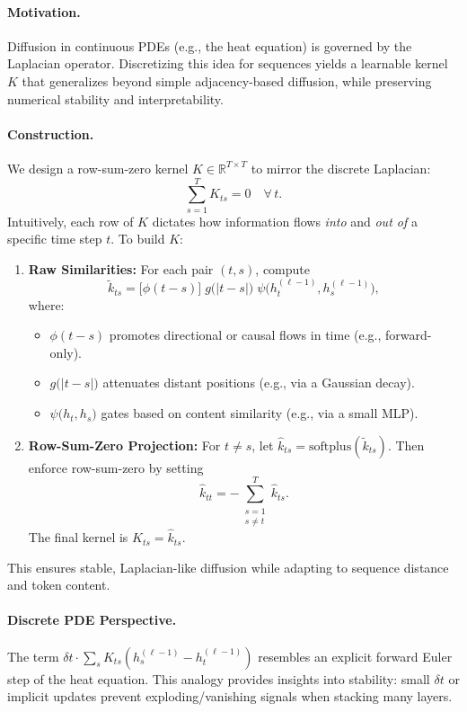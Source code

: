 \paragraph{Motivation.}
Diffusion in continuous PDEs (e.g., the heat equation) is governed by the Laplacian operator. Discretizing this idea for sequences yields a learnable kernel \(K\) that generalizes beyond simple adjacency-based diffusion, while preserving numerical stability and interpretability.

\paragraph{Construction.}
We design a row-sum-zero kernel 
\(\displaystyle K \in \mathbb{R}^{T\times T}\)
to mirror the discrete Laplacian:
\[
\sum_{s=1}^T K_{ts} = 0 \quad \forall\,t.
\]
Intuitively, each row of \(K\) dictates how information flows \emph{into} and \emph{out of} a specific time step \(t\). To build \(K\):
\begin{enumerate}
    \item \textbf{Raw Similarities:} For each pair \((t, s)\), compute
    \[
    \tilde{k}_{ts}
    = \bigl[\phi(t-s)\bigr]
      \; g\bigl(\lvert t-s\rvert\bigr)
      \; \psi\bigl(h_t^{(\ell-1)}, h_s^{(\ell-1)}\bigr),
    \]
    where:
    \begin{itemize}
        \item \(\phi(t-s)\) promotes directional or causal flows in time (e.g., forward-only).
        \item \(g\bigl(\lvert t-s\rvert\bigr)\) attenuates distant positions (e.g., via a Gaussian decay).
        \item \(\psi\bigl(h_t, h_s\bigr)\) gates based on content similarity (e.g., via a small MLP).
    \end{itemize}
    \item \textbf{Row-Sum-Zero Projection:} 
    For \(t \neq s\), let 
    \(\displaystyle \widehat{k}_{ts} = \text{softplus}(\tilde{k}_{ts})\). 
    Then enforce row-sum-zero by setting
    \[
    \widehat{k}_{tt} 
    = - \sum_{\substack{s=1 \\ s \neq t}}^T \widehat{k}_{ts}.
    \]
    The final kernel is \(K_{ts} = \widehat{k}_{ts}\).
\end{enumerate}
This ensures stable, Laplacian-like diffusion while adapting to sequence distance and token content.

\paragraph{Discrete PDE Perspective.}
The term 
\(\delta t \cdot \sum_{s}K_{ts} (h_s^{(\ell-1)} - h_t^{(\ell-1)})\)
resembles an explicit forward Euler step of the heat equation. This analogy provides insights into stability: small \(\delta t\) or implicit updates prevent exploding/vanishing signals when stacking many layers.

